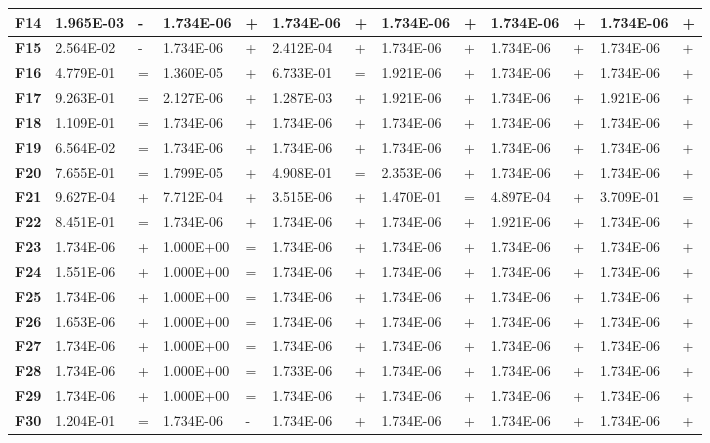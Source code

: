 \documentclass{article} %
\begin{document}
\begin{tabular}{|p{0.3in}|p{0.7in}|p{0.2in}|p{0.7in}|p{0.2in}|p{0.7in}|p{0.2in}|p{0.5in}|p{0.2in}|p{0.5in}|p{0.2in}|p{0.6in}|p{0.2in}|}
\textbf{F14} & 1.965E-03 & - & 1.734E-06 & + & 1.734E-06 & + & 1.734E-06 & + & 1.734E-06 & + & 1.734E-06 & + \\ \hline 
\textbf{F15} & 2.564E-02 & - & 1.734E-06 & + & 2.412E-04 & + & 1.734E-06 & + & 1.734E-06 & + & 1.734E-06 & + \\ \hline 
\textbf{F16} & 4.779E-01 & = & 1.360E-05 & + & 6.733E-01 &  = & 1.921E-06 & + & 1.734E-06 & + & 1.734E-06 & + \\ \hline 
\textbf{F17} & 9.263E-01 & = & 2.127E-06 & + & 1.287E-03 & + & 1.921E-06 & + & 1.734E-06 & + & 1.921E-06 & + \\ \hline 
\textbf{F18} & 1.109E-01 & = & 1.734E-06 & + & 1.734E-06 & + & 1.734E-06 & + & 1.734E-06 & + & 1.734E-06 & + \\ \hline 
\textbf{F19} & 6.564E-02 & = & 1.734E-06 & + & 1.734E-06 & + & 1.734E-06 & + & 1.734E-06 & + & 1.734E-06 & + \\ \hline 
\textbf{F20} & 7.655E-01 & = & 1.799E-05 & + & 4.908E-01 &  = & 2.353E-06 & + & 1.734E-06 & + & 1.734E-06 & + \\ \hline 
\textbf{F21} & 9.627E-04 & + & 7.712E-04 & + & 3.515E-06 & + & 1.470E-01 &  = & 4.897E-04 & + & 3.709E-01 &  = \\ \hline 
\textbf{F22} & 8.451E-01 & = & 1.734E-06 & + & 1.734E-06 & + & 1.734E-06 & + & 1.921E-06 & + & 1.734E-06 & + \\ \hline 
\textbf{F23} & 1.734E-06 & + & 1.000E+00 &  = & 1.734E-06 & + & 1.734E-06 & + & 1.734E-06 & + & 1.734E-06 & + \\ \hline 
\textbf{F24} & 1.551E-06 & + & 1.000E+00 &  = & 1.734E-06 & + & 1.734E-06 & + & 1.734E-06 & + & 1.734E-06 & + \\ \hline 
\textbf{F25} & 1.734E-06 & + & 1.000E+00 &  = & 1.734E-06 & + & 1.734E-06 & + & 1.734E-06 & + & 1.734E-06 & + \\ \hline 
\textbf{F26} & 1.653E-06 & + & 1.000E+00 &  = & 1.734E-06 & + & 1.734E-06 & + & 1.734E-06 & + & 1.734E-06 & + \\ \hline 
\textbf{F27} & 1.734E-06 & + & 1.000E+00 &  = & 1.734E-06 & + & 1.734E-06 & + & 1.734E-06 & + & 1.734E-06 & + \\ \hline 
\textbf{F28} & 1.734E-06 & + & 1.000E+00 &  = & 1.733E-06 & + & 1.734E-06 & + & 1.734E-06 & + & 1.734E-06 & + \\ \hline 
\textbf{F29} & 1.734E-06 & + & 1.000E+00 &  = & 1.734E-06 & + & 1.734E-06 & + & 1.734E-06 & + & 1.734E-06 & + \\ \hline 
\textbf{F30} & 1.204E-01 & = & 1.734E-06 & - & 1.734E-06 & + & 1.734E-06 & + & 1.734E-06 & + & 1.734E-06 & + \\ \hline 

\end{tabular}
\end{document}
